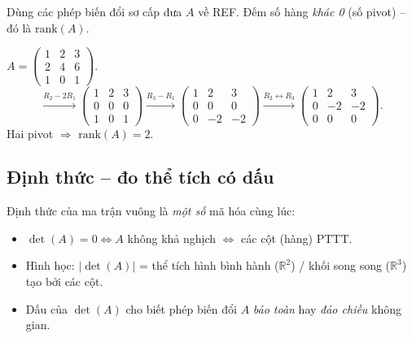 \documentclass[12pt,a4paper]{article}
\begin{document}
\begin{phuongphap}[title={Tính hạng bằng khử Gauss}]
Dùng các phép biến đổi sơ cấp đưa $A$ về REF. Đếm số hàng \emph{khác 0} (số pivot) -- đó là $\mathrm{rank}(A)$.
\end{phuongphap}

\begin{vidu}
$A = \begin{pmatrix}1 & 2 & 3\\ 2 & 4 & 6 \\ 1 & 0 & 1\end{pmatrix}$.
\[
  \xrightarrow{R_2 - 2R_1}\begin{pmatrix}1 & 2 & 3\\0 & 0 & 0\\1 & 0 & 1\end{pmatrix} \xrightarrow{R_3 - R_1} \begin{pmatrix}1 & 2 & 3\\0 & 0 & 0\\0 & -2 & -2\end{pmatrix} \xrightarrow{R_2 \leftrightarrow R_3} \begin{pmatrix}1 & 2 & 3\\0 & -2 & -2\\0 & 0 & 0\end{pmatrix}.
\]
Hai pivot $\Rightarrow$ $\mathrm{rank}(A) = 2$.
\end{vidu}

\subsection{Định thức -- đo thể tích có dấu}

\begin{dongco}
Định thức của ma trận vuông là \emph{một số} mã hóa cùng lúc:
\begin{itemize}
  \item $\det(A) = 0 \Leftrightarrow A$ không khả nghịch $\Leftrightarrow$ các cột (hàng) PTTT.
  \item Hình học: $|\det(A)|$ = thể tích hình bình hành ($\mathbb{R}^2$) / khối song song ($\mathbb{R}^3$) tạo bởi các cột.
  \item Dấu của $\det(A)$ cho biết phép biến đổi $A$ \emph{bảo toàn} hay \emph{đảo chiều} không gian.
\end{itemize}
\end{dongco}
\end{document}
